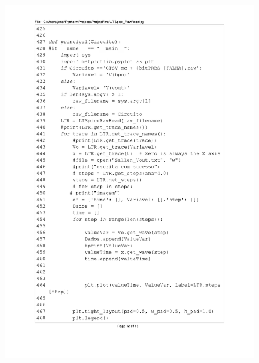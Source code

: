 \begin{figure}[]
\centering
\includegraphics[scale=0.9]{01_Pre_textuais/code/leitura12.pdf}
\end{figure}
